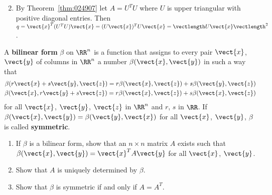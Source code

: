 \begin{multicols}{2}
\begin{ex}
\begin{enumerate}[label={\alph*.}]
\end{enumerate}
\begin{sol}
\begin{enumerate}[label={\alph*.}]
\setcounter{enumi}{1}
\item By Theorem~\ref{thm:024907} let $A = U^{T}U$ where $U$ is upper triangular with positive diagonal entries. Then $q = \vect{x}^{T}(U^{T}U)\vect{x} = (U\vect{x})^{T}U\vect{x} = \vectlength U\vect{x} \vectlength^{2}$.

\end{enumerate}
\end{sol}
\end{ex}


\begin{ex}
A \textbf{bilinear form} $\beta$ on $\RR^n$ is a function that assigns to every pair $\vect{x}$, $\vect{y}$ of columns in $\RR^n$ a number $\beta(\vect{x}, \vect{y})$ in such a way that
\begin{align*}
\beta(r\vect{x} + s\vect{y}, \vect{z}) = r\beta(\vect{x}, \vect{z}) + s\beta(\vect{y}, \vect{z}) \\
\beta(\vect{x}, r\vect{y} + s\vect{z}) = r\beta(\vect{x}, \vect{z}) + s\beta(\vect{x}, \vect{z})
\end{align*}
for all $\vect{x}$, $\vect{y}$, $\vect{z}$ in $\RR^n$ and $r$, $s$ in $\RR$. If $\beta(\vect{x}, \vect{y}) = \beta(\vect{y}, \vect{x})$ for all $\vect{x}$, $\vect{y}$, $\beta$ is called \textbf{symmetric}.


\begin{enumerate}[label={\alph*.}]
\item If $\beta$ is a bilinear form, show that an $n \times n$ matrix $A$ exists such that $\beta(\vect{x}, \vect{y}) = \vect{x}^{T}A\vect{y}$ for all $\vect{x}$, $\vect{y}$.

\item Show that $A$ is uniquely determined by $\beta$.

\item Show that $\beta$ is symmetric if and only if $A = A^{T}$.

\end{enumerate}
\end{ex}
\end{multicols}
